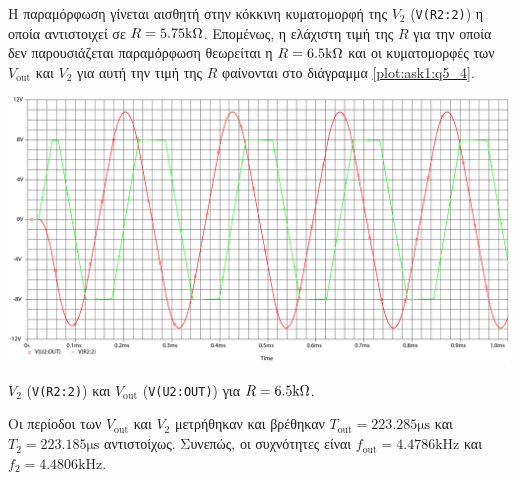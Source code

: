 Η παραμόρφωση γίνεται αισθητή στην κόκκινη κυματομορφή της $V_2$ (\texttt{V(R2:2)}) η οποία αντιστοιχεί σε $R=5.75\kohm$. Επομένως, η ελάχιστη τιμή της $R$ για την οποία δεν παρουσιάζεται παραμόρφωση θεωρείται η $R=6.5\kohm$ και οι κυματομορφές των $V_{\mathrm{out}}$ και $V_2$ για αυτή την  τιμή της $R$ φαίνονται στο διάγραμμα \ref{plot:ask1:q5_4}.

\begin{chart}[H]
	\begin{center}
		\includegraphics[width=15cm]{spice_01/q5_4.pdf}
		\caption{$V_2$ (\texttt{V(R2:2)}) και $V_{\mathrm{out}}$ (\texttt{V(U2:OUT)}) για $R=6.5\kohm$.}
		\label{plot:ask1:q5_4}
	\end{center}
\end{chart}

Οι περίοδοι των $V_{\mathrm{out}}$ και $V_2$ μετρήθηκαν και βρέθηκαν $T_{\mathrm{out}}=223.285\unit{\micro\second}$ και $T_{2}=223.185\unit{\micro\second}$ αντιστοίχως. Συνεπώς, οι συχνότητες είναι $f_{\mathrm{out}}=4.4786\unit{\kilo\hertz}$ και $f_2=4.4806\unit{\kilo\hertz}$.